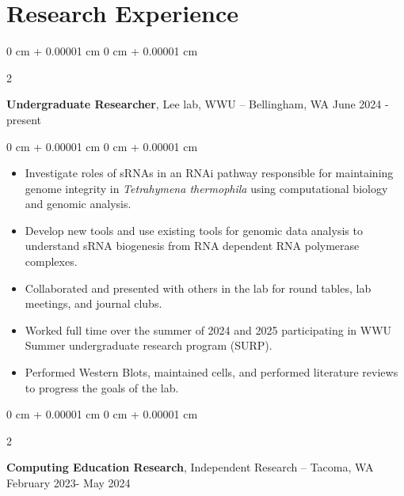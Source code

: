 \documentclass[10pt, article]{article}
\newenvironment{highlights}{
    \begin{itemize}[
        topsep=0.10 cm,
        parsep=0.10 cm,
        partopsep=0pt,
        itemsep=0pt,
        leftmargin=0 cm + 10pt
    ]
}{
    \end{itemize}
} %
\newenvironment{onecolentry}{
    \begin{adjustwidth}{
        0 cm + 0.00001 cm
    }{
        0 cm + 0.00001 cm
    }
}{
    \end{adjustwidth}
} %
\newenvironment{twocolentry}[2][]{
    \onecolentry
    \def\secondColumn{#2}
    \setcolumnwidth{\fill, 4.5 cm}
    \begin{paracol}{2}
}{
    \switchcolumn \raggedleft \secondColumn
    \end{paracol}
    \endonecolentry
} %
\begin{document}
    \section{Research Experience}




        \begin{twocolentry}{
            June 2024 - present
        }
            \textbf{Undergraduate Researcher}, Lee lab, WWU -- Bellingham, WA\end{twocolentry}

        \vspace{0.10 cm}
        \begin{onecolentry}
            \begin{highlights}
            \item Investigate roles of sRNAs in an RNAi pathway responsible for maintaining genome integrity in \textit{Tetrahymena thermophila} using computational biology and genomic analysis.
            \item Develop new tools and use existing tools for genomic data analysis to understand sRNA biogenesis from RNA dependent RNA polymerase complexes.
            \item Collaborated and presented with others in the lab for round tables, lab meetings, and journal clubs.
            \item Worked full time over the summer of 2024 and 2025 participating in WWU Summer undergraduate research program (SURP).
            \item Performed Western Blots, maintained cells, and performed literature reviews to progress the goals of the lab.
            \end{highlights}
        \end{onecolentry}


        \vspace{0.2 cm}

        \begin{twocolentry}{
            February 2023- May 2024
        }
            \textbf{Computing Education Research}, Independent Research -- Tacoma, WA\end{twocolentry}
\end{document}
